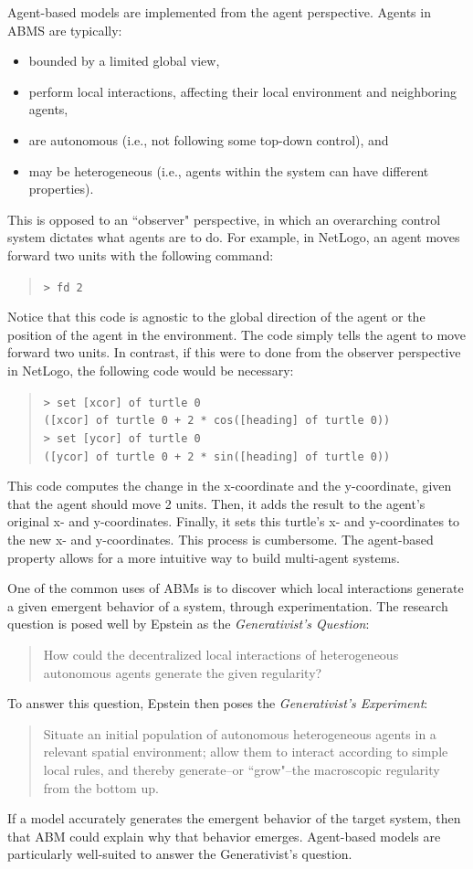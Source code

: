 Agent-based models are implemented from the agent perspective.
Agents in ABMS are typically:
\begin{itemize}
   \item bounded by a limited global view,
   \item perform local interactions, affecting their local environment and neighboring agents,
   \item are autonomous (i.e., not following some top-down control), and
   \item may be heterogeneous (i.e., agents within the system can have different properties).
\end{itemize}\cite{epstein1999agent}
This is opposed to an ``observer" perspective, in which an overarching control system dictates what agents are to do.
For example, in NetLogo, an agent moves forward two units with the following command:
\begin{quote}
\texttt{\small > fd 2}
\end{quote}
Notice that this code is agnostic to the global direction of the agent or the position of the agent in the environment.
The code simply tells the agent to move forward two units.
In contrast, if this were to done from the observer perspective in NetLogo, the following code would be necessary:
\begin{quote}
\texttt{\small > set [xcor] of turtle 0\\
([xcor] of turtle 0 + 2 * cos([heading] of turtle 0))\\
> set [ycor] of turtle 0\\
([ycor] of turtle 0 + 2 * sin([heading] of turtle 0))}
\end{quote}
This code computes the change in the x-coordinate and the y-coordinate, given that the agent should move 2 units.
Then, it adds the result to the agent's original x- and y-coordinates.
Finally, it sets this turtle's x- and y-coordinates to the new x- and y-coordinates.
This process is cumbersome.
The agent-based property allows for a more intuitive way to build multi-agent systems.

One of the common uses of ABMs is to discover which local interactions generate a given emergent behavior of a system, through experimentation.
The research question is posed well by Epstein as the \textit{Generativist's Question}:
\begin{quote}
   How could the decentralized local interactions of heterogeneous autonomous agents generate the given regularity?
\end{quote}
To answer this question, Epstein then poses the \textit{Generativist's Experiment}:
\begin{quote}
Situate an initial population of autonomous heterogeneous agents in a relevant spatial environment; allow them to interact according to simple local rules, and thereby generate--or ``grow"--the macroscopic regularity from the bottom up. \cite{epstein1999agent}
\end{quote}
If a model accurately generates the emergent behavior of the target system, then that ABM could explain why that behavior emerges.
Agent-based models are particularly well-suited to answer the Generativist's question.

